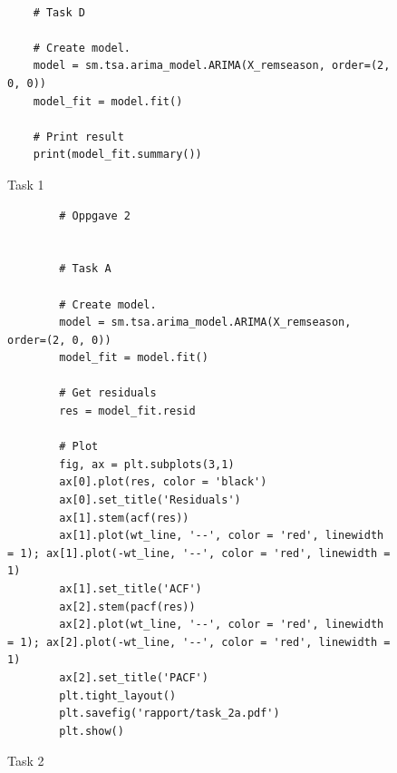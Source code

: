 \begin{figure}[hbt!]
\begin{lstlisting}
    
    # Task D
    
    # Create model.
    model = sm.tsa.arima_model.ARIMA(X_remseason, order=(2, 0, 0))
    model_fit = model.fit()
    
    # Print result
    print(model_fit.summary())
\end{lstlisting}
\caption{Task 1}
\label{Kode3}
\end{figure}




\begin{figure}[hbt!]
    \begin{lstlisting}
        # Oppgave 2


        # Task A

        # Create model.
        model = sm.tsa.arima_model.ARIMA(X_remseason, order=(2, 0, 0))
        model_fit = model.fit()

        # Get residuals
        res = model_fit.resid
        
        # Plot
        fig, ax = plt.subplots(3,1)
        ax[0].plot(res, color = 'black')
        ax[0].set_title('Residuals')
        ax[1].stem(acf(res))
        ax[1].plot(wt_line, '--', color = 'red', linewidth = 1); ax[1].plot(-wt_line, '--', color = 'red', linewidth = 1)
        ax[1].set_title('ACF')
        ax[2].stem(pacf(res))
        ax[2].plot(wt_line, '--', color = 'red', linewidth = 1); ax[2].plot(-wt_line, '--', color = 'red', linewidth = 1)
        ax[2].set_title('PACF')
        plt.tight_layout()
        plt.savefig('rapport/task_2a.pdf')
        plt.show()
    \end{lstlisting}
\caption{Task 2}
\label{Kode4}
\end{figure}


